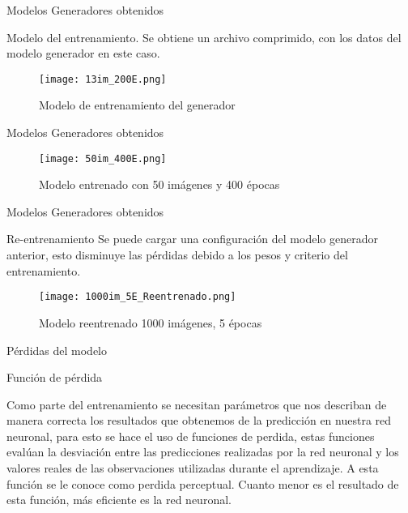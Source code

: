 \begin{frame}{Modelos Generadores obtenidos}
    \begin{block}{Modelo del entrenamiento.}
        Se obtiene un archivo comprimido, con los datos del modelo generador en este caso.
    \end{block}
    \begin{figure}[H]
        \begin{center}
          \texttt{[image: 13im\_200E.png]}
          \caption{Modelo de entrenamiento del generador}
          \label{Alexis6}
        \end{center}
    \end{figure}
    
\end{frame}

\begin{frame}{Modelos Generadores obtenidos}
  
    \begin{figure}[H]
        \begin{center}
          \texttt{[image: 50im\_400E.png]}
          \caption{Modelo entrenado con 50 imágenes y 400 épocas}
          \label{Alexis7}
        \end{center}
    \end{figure}
     
\end{frame}


\begin{frame}{Modelos Generadores obtenidos}
    \begin{block}{Re-entrenamiento}
        Se puede cargar una configuración del modelo generador anterior, esto disminuye las pérdidas 
        debido a los pesos y criterio del entrenamiento.
    \end{block}
    \begin{figure}[H]
        \begin{center}
          \texttt{[image: 1000im\_5E\_Reentrenado.png]}
          \caption{Modelo reentrenado 1000 imágenes, 5 épocas}
          \label{Alexis8}
        \end{center}
    \end{figure}
     
\end{frame}


\begin{frame}{Pérdidas del modelo}
    \begin{block}{Función de pérdida}
        
   
        Como parte del entrenamiento se necesitan parámetros que nos describan de manera correcta los resultados
        que obtenemos de la predicción en nuestra red neuronal, para esto se hace el uso de funciones de perdida, estas funciones 
        evalúan la desviación entre las predicciones realizadas por la red neuronal y los valores 
        reales de las observaciones utilizadas durante el aprendizaje. A esta función se le conoce como perdida perceptual. Cuanto menor es el resultado de esta función, 
        más eficiente es la red neuronal.

    \end{block}    
\end{frame}


